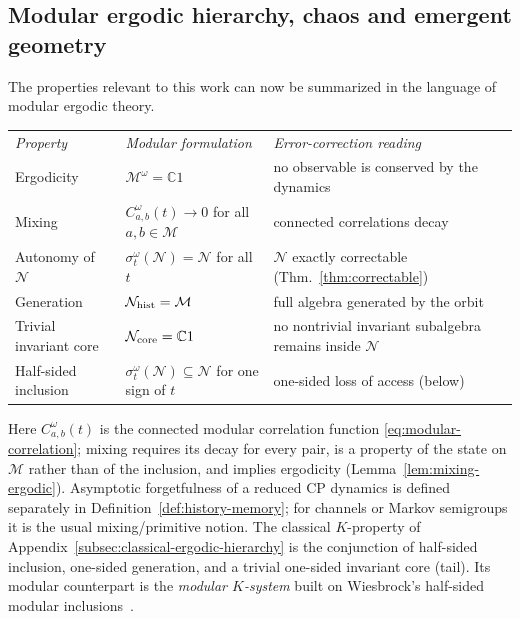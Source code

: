 \documentclass[a4paper,11pt]{article}
\theoremstyle{definition}
\newcommand{\mN}{\mathcal{N}}
\newcommand{\mM}{\mathcal{M}}
\begin{document}
\subsection{Modular ergodic hierarchy, chaos and emergent geometry}\label{subsec:QEC-hierarchy}\label{subsec:geometry-modular-ergodic}\label{subsec:geometry-K-systems}

The properties relevant to this work can now be summarized in the language of modular ergodic theory.
\begin{center}
\begin{tabular}{lll}
 \textit{Property} & \textit{Modular formulation} & \textit{Error-correction reading}\\[4pt]
 Ergodicity & $\mM^\omega=\mathbb C1$ & no observable is conserved by the dynamics\\
 Mixing & $C_{a,b}^\omega(t)\to0$ for all $a,b\in\mM$ & connected correlations decay\\
 Autonomy of $\mN$ & $\sigma^\omega_t(\mN)=\mN$ for all $t$ & $\mN$ exactly correctable (Thm.~\ref{thm:correctable})\\
 Generation & $\mN_{\rm hist}=\mM$ & full algebra generated by the orbit\\
 Trivial invariant core & $\mN_{\rm core}=\mathbb C1$ & no nontrivial invariant subalgebra remains inside $\mN$\\
 Half-sided inclusion & $\sigma^\omega_t(\mN)\subseteq\mN$ for one sign of $t$ & one-sided loss of access (below)
\end{tabular}
\end{center}
Here $C^\omega_{a,b}(t)$ is the connected modular correlation function \eqref{eq:modular-correlation}; mixing requires its decay for every pair, is a property of the state on $\mM$ rather than of the inclusion, and implies ergodicity (Lemma~\ref{lem:mixing-ergodic}). Asymptotic forgetfulness of a reduced CP dynamics is defined separately in Definition~\ref{def:history-memory}; for channels or Markov semigroups it is the usual mixing/primitive notion. The classical $K$-property of Appendix~\ref{subsec:classical-ergodic-hierarchy} is the conjunction of half-sided inclusion, one-sided generation, and a trivial one-sided invariant core (tail). Its modular counterpart is the \emph{modular $K$-system} built on Wiesbrock's half-sided modular inclusions~\cite{Wiesbrock1993}.
\end{document}
